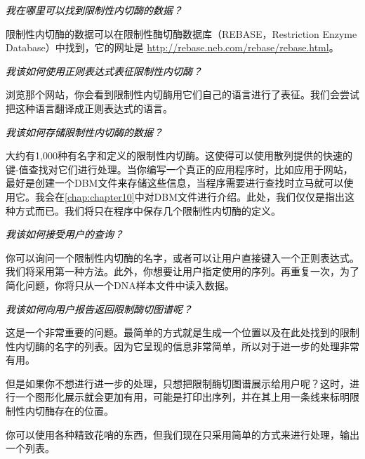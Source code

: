 \textcolor{black}{\textit{我在哪里可以找到限制性内切酶的数据？}}
\begin{adjustwidth}{4em}{}
\hspace*{2em}限制性内切酶的数据可以在限制性酶切酶数据库（REBASE，Restriction Enzyme Database）中找到，它的网址是 \href{http://rebase.neb.com/rebase/rebase.html}{http://rebase.neb.com/rebase/rebase.html}。
\end{adjustwidth}

\textcolor{black}{\textit{我该如何使用正则表达式表征限制性内切酶？}}
\begin{adjustwidth}{4em}{}
\hspace*{2em}浏览那个网站，你会看到限制性内切酶用它们自己的语言进行了表征。我们会尝试把这种语言翻译成正则表达式的语言。
\end{adjustwidth}

\textcolor{black}{\textit{我该如何存储限制性内切酶的数据？}}
\begin{adjustwidth}{4em}{}
\hspace*{2em}大约有1,000种有名字和定义的限制性内切酶。这使得可以使用散列提供的快速的键-值查找对它们进行处理。当你编写一个真正的应用程序时，比如应用于网站，最好是创建一个DBM文件来存储这些信息，当程序需要进行查找时立马就可以使用它。我会在\autoref{chap:chapter10}中对DBM文件进行介绍。此处，我们仅仅是指出这种方式而已。我们将只在程序中保存几个限制性内切酶的定义。
\end{adjustwidth}

\textcolor{black}{\textit{我该如何接受用户的查询？}}
\begin{adjustwidth}{4em}{}
\hspace*{2em}你可以询问一个限制性内切酶的名字，或者可以让用户直接键入一个正则表达式。我们将采用第一种方法。此外，你想要让用户指定使用的序列。再重复一次，为了简化问题，你将只从一个DNA样本文件中读入数据。
\end{adjustwidth}

\textcolor{black}{\textit{我该如何向用户报告返回限制酶切图谱呢？}}
\begin{adjustwidth}{4em}{}
\hspace*{2em}这是一个非常重要的问题。最简单的方式就是生成一个位置以及在此处找到的限制性内切酶的名字的列表。因为它呈现的信息非常简单，所以对于进一步的处理非常有用。

但是如果你不想进行进一步的处理，只想把限制酶切图谱展示给用户呢？这时，进行一个图形化展示就会更加有用，可能是打印出序列，并在其上用一条线来标明限制性内切酶存在的位置。

你可以使用各种精致花哨的东西，但我们现在只采用简单的方式来进行处理，输出一个列表。
\end{adjustwidth}


